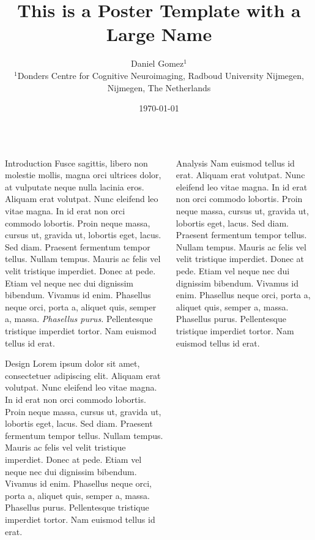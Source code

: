\documentclass[t]{beamer}
\author{
  Daniel Gomez$^{1}$
  \\
  \vspace{5mm}
  \normalsize{$^{1}$Donders Centre for Cognitive Neuroimaging,}
  \normalsize{Radboud University Nijmegen,}
  \normalsize{Nijmegen, The Netherlands}
}
\date{\today}
\title{This is a Poster Template with a Large Name}
\begin{document}
\begin{frame}[label={sec:orgafca15d}]{}
  \begin{columns}
    \begin{column}{0.3\columnwidth}
      \begin{block}{Introduction}
        Fusce sagittis, libero non molestie mollis, magna orci ultrices dolor, at vulputate neque nulla lacinia eros. Aliquam erat volutpat.  Nunc eleifend leo vitae magna. \parencite{Shrout1979}  In id erat non orci commodo lobortis.  Proin neque massa, cursus ut, gravida ut, lobortis eget, lacus.  Sed diam.  \alert{Praesent fermentum tempor tellus.}  Nullam tempus.  Mauris ac felis vel velit tristique imperdiet.  Donec at pede.  Etiam vel neque nec dui dignissim bibendum.  Vivamus id enim.  Phasellus neque orci, porta a, aliquet quis, semper a, massa.  \emph{Phasellus purus.}  Pellentesque tristique imperdiet tortor.  Nam euismod tellus id erat.
      \end{block}


      \begin{block}{Design}
        Lorem ipsum dolor sit amet, consectetuer adipiscing elit.  Aliquam erat volutpat.  Nunc eleifend leo vitae magna.  In id erat non orci commodo lobortis.  Proin neque massa, cursus ut, gravida ut, lobortis eget, lacus.  Sed diam.  Praesent fermentum tempor tellus.  Nullam tempus.  Mauris ac felis vel velit tristique imperdiet.  Donec at pede.  Etiam vel neque nec dui dignissim bibendum.  Vivamus id enim.  Phasellus neque orci, porta a, aliquet quis, semper a, massa.  Phasellus purus.  Pellentesque tristique imperdiet tortor.  Nam euismod tellus id erat. \parencite{Gratton2018}
      \end{block}
    \end{column}



    \begin{column}{0.3\columnwidth}
      \begin{block}{Analysis}
        Nam euismod tellus id erat.  Aliquam erat volutpat.  Nunc eleifend leo vitae magna.  In id erat non orci commodo lobortis.  Proin neque massa, cursus ut, gravida ut, lobortis eget, lacus.  Sed diam.  Praesent fermentum tempor tellus.  Nullam tempus.  Mauris ac felis vel velit tristique imperdiet.  Donec at pede.  Etiam vel neque nec dui dignissim bibendum.  Vivamus id enim.  Phasellus neque orci, porta a, aliquet quis, semper a, massa.  Phasellus purus.  Pellentesque tristique imperdiet tortor.  Nam euismod tellus id erat.
      \end{block}



\end{column}
\end{columns}
\end{frame}
\end{document}
